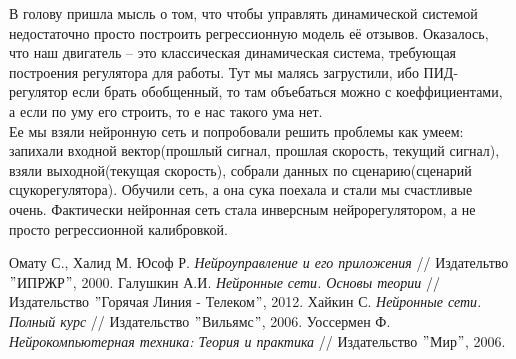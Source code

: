 \documentclass[14pt]{extreport}
\begin{document}
            В голову пришла мысль о том, что чтобы управлять динамической системой недостаточно просто построить регрессионную модель её отзывов. Оказалось, что наш двигатель -- это классическая динамическая система, требующая построения регулятора для работы. Тут мы малясь загрустили, ибо ПИД-регулятор если брать обобщенный, то там объебаться можно с коеффициентами, а если по уму его строить, то е нас такого ума нет.\\
            Ее мы взяли нейронную сеть и попробовали решить проблемы как умеем: запихали входной вектор(прошлый сигнал, прошлая скорость, текущий сигнал), взяли выходной(текущая скорость), собрали данных по сценарию(сценарий сцукорегулятора). Обучили сеть, а она сука поехала и стали мы счастливые очень. Фактически нейронная сеть стала инверсным нейрорегулятором, а не просто регрессионной калибровкой.
\newpage
        \begin{thebibliography}{99}
             Омату С., Халид М. Юсоф Р. {\it Нейроуправление и его приложения} // Издательтво $"$ИПРЖР$"$, 2000.
             Галушкин А.И. {\it Нейронные сети. Основы теории} // Издательство $"$Горячая Линия - Телеком$"$, 2012.
             Хайкин С. {\it Нейронные сети. Полный курс} // Издательство $"$Вильямс$"$, 2006.
             Уоссермен Ф. {\it Нейрокомпьютерная техника: Теория и практика} // Издательство $"$Мир$"$, 2006.
        \end{thebibliography}
\end{document}
